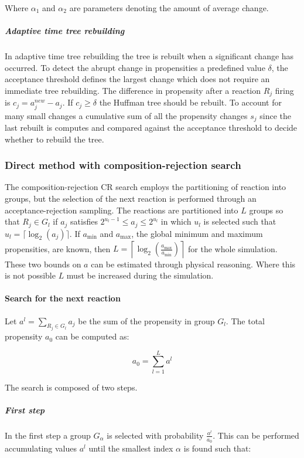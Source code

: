           Where $\alpha_1$ and $\alpha_2$ are parameters denoting the amount of average change.

        \subparagraph{Adaptive time tree rebuilding}
        In adaptive time tree rebuilding the tree is rebuilt when a significant change has occurred.
        To detect the abrupt change in propensities a predefined value $\delta$, the acceptance threshold defines the largest change which does not require an immediate tree rebuilding.
        The difference in propensity after a reaction $R_j$ firing is $c_j = a_j^{new}-a_j$.
        If $c_j \ge \delta$ the Huffman tree should be rebuilt.
        To account for many small changes a cumulative sum of all the propensity changes $s_j$ since the last rebuilt is computes and compared against the acceptance threshold to decide whether to rebuild the tree.

    \subsubsection{Direct method with composition-rejection search}
    The composition-rejection CR search employs the partitioning of reaction into groups, but the selection of the next reaction is performed through an acceptance-rejection sampling.
    The reactions are partitioned into $L$ groups so that $R_j\in G_l$ if $a_j$ satisfies $2^{u_l-1}\le a_j\le 2^{u_l}$ in which $u_l$ is selected such that $u_l=\lceil \log_2(a_j)\rceil$.
    If $a_{\min}$ and $a_{\max}$, the global minimum and maximum propensities, are known, then $L = \left\lceil\log_2\left(\frac{a_{\max}}{a_{\min}}\right)\right\rceil$ for the whole simulation.
    These two bounds on $a$ can be estimated through physical reasoning.
    Where this is not possible $L$ must be increased during the simulation.

      \paragraph{Search for the next reaction}
      Let $a^l = \sum\limits_{R_j\in G_l}a_j$ be the sum of the propensity in group $G_l$.
      The total propensity $a_0$ can be computed as:

      $$a_0 = \sum\limits_{l=1}^La^l$$

      The search is composed of two steps.

        \subparagraph{First step}
        In the first step a group $G_\alpha$ is selected with probability $\frac{a^l}{a_0}$.
        This can be performed accumulating values $a^l$ until the smallest index $\alpha$ is found such that:

